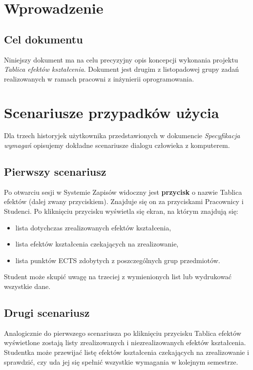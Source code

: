 \documentclass{article}
\begin{document}
\tableofcontents

\newpage


\section{Wprowadzenie}

\subsection{Cel dokumentu}
Niniejszy dokument ma na celu precyzyjny opis koncepcji wykonania projektu \textit{Tablica efektów kształcenia}.
Dokument jest drugim z listopadowej grupy zadań realizowanych w ramach pracowni z inżynierii oprogramowania.

\section{Scenariusze przypadków użycia}
Dla trzech historyjek użytkownika przedstawionych w dokumencie \textit{Specyfikacja wymagań} opisujemy dokładne scenariusze dialogu człowieka z komputerem.

\subsection{Pierwszy scenariusz}
Po otwarciu sesji w Systemie Zapisów widoczny jest \textbf{przycisk} o nazwie \textsf{Tablica efektów} (dalej zwany przyciskiem). 
Znajduje się on za przyciskami \textsf{Pracownicy} i \textsf{Studenci}. Po kliknięciu przycisku wyświetla się ekran, na którym znajdują się:
\begin{itemize}
	\item lista dotychczas zrealizowanych efektów kształcenia,
	\item lista efektów kształcenia czekających na zrealizowanie,
	\item lista punktów ECTS zdobytych z poszczególnych grup przedmiotów.
\end{itemize}
Student może skupić uwagę na trzeciej z wymienionych list lub wydrukować wszystkie dane.

\subsection{Drugi scenariusz}
Analogicznie do pierwszego scenariusza po kliknięciu przycisku \textsf{Tablica efektów} wyświetlone zostają listy zrealizowanych i niezrealizowanych efektów kształcenia.
Studentka może przewijać listę efektów kształcenia czekających na zrealizowanie i sprawdzić, czy uda jej się spełnić wszystkie wymagania w kolejnym semestrze.
\end{document}
